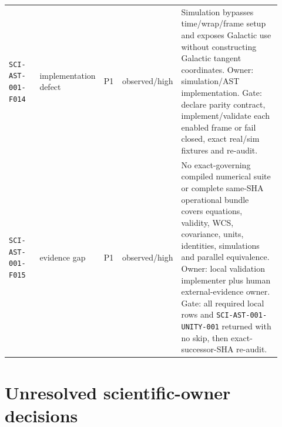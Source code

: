 \documentclass[11pt]{article}
\newcommand{\code}[1]{\nolinkurl{#1}}
\begin{document}
\begin{longtable}{L{0.14\linewidth}L{0.13\linewidth}L{0.07\linewidth}L{0.11\linewidth}L{0.47\linewidth}}
\code{SCI-AST-001-F014} & implementation defect & P1 & observed/high & Simulation bypasses time/wrap/frame setup and exposes Galactic use without constructing Galactic tangent coordinates. Owner: simulation/AST implementation. Gate: declare parity contract, implement/validate each enabled frame or fail closed, exact real/sim fixtures and re-audit. \\
\code{SCI-AST-001-F015} & evidence gap & P1 & observed/high & No exact-governing compiled numerical suite or complete same-SHA operational bundle covers equations, validity, WCS, covariance, units, identities, simulations and parallel equivalence. Owner: local validation implementer plus human external-evidence owner. Gate: all required local rows and \code{SCI-AST-001-UNITY-001} returned with no skip, then exact-successor-SHA re-audit. \\
\bottomrule
\end{longtable}

\section{Unresolved scientific-owner decisions}
\end{document}
